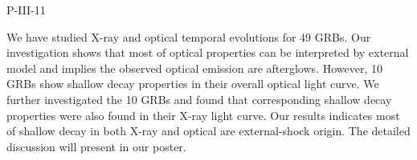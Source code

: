 P-III-11


\bigskip



\bigskip

\noindent We have studied X-ray and optical temporal evolutions for 49 GRBs. Our investigation shows that most of optical properties can be interpreted by external model and implies the observed optical emission are afterglows. However, 10 GRBs show shallow decay properties in their overall optical light curve. We further investigated  the 10 GRBs and found that corresponding shallow decay properties were also found in their X-ray light curve. Our results indicates most of shallow decay in both X-ray and optical are external-shock origin. The detailed discussion will present in our poster.
